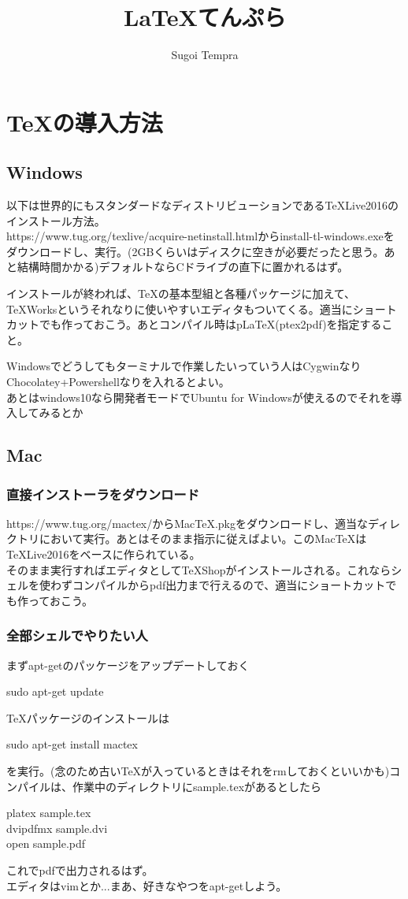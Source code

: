 \documentclass[11pt]{report}
\title{LaTeXてんぷら}
\author{Sugoi Tempra}
\begin{document}
\maketitle%
\tableofcontents%

\chapter{TeXの導入方法}
\section{Windows}
以下は世界的にもスタンダードなディストリビューションであるTeXLive2016のインストール方法。\\
https://www.tug.org/texlive/acquire-netinstall.htmlからinstall-tl-windows.exeをダウンロードし、実行。(2GBくらいはディスクに空きが必要だったと思う。あと結構時間かかる)デフォルトならCドライブの直下に置かれるはず。

インストールが終われば、TeXの基本型組と各種パッケージに加えて、TeXWorksというそれなりに使いやすいエディタもついてくる。適当にショートカットでも作っておこう。あとコンパイル時はpLaTeX(ptex2pdf)を指定すること。

Windowsでどうしてもターミナルで作業したいっていう人はCygwinなりChocolatey+Powershellなりを入れるとよい。\\
あとはwindows10なら開発者モードでUbuntu for Windowsが使えるのでそれを導入してみるとか

\section{Mac}
\subsection{直接インストーラをダウンロード}
https://www.tug.org/mactex/からMacTeX.pkgをダウンロードし、適当なディレクトリにおいて実行。あとはそのまま指示に従えばよい。このMacTeXはTeXLive2016をベースに作られている。\\
そのまま実行すればエディタとしてTeXShopがインストールされる。これならシェルを使わずコンパイルからpdf出力まで行えるので、適当にショートカットでも作っておこう。
\subsection{全部シェルでやりたい人}
まずapt-getのパッケージをアップデートしておく
\begin{center}
sudo apt-get update
\end{center}
TeXパッケージのインストールは
\begin{center}
sudo apt-get install mactex
\end{center}
を実行。(念のため古いTeXが入っているときはそれをrmしておくといいかも)コンパイルは、作業中のディレクトリにsample.texがあるとしたら
\begin{center}
platex sample.tex\\
dvipdfmx sample.dvi\\
open sample.pdf
\end{center}
これでpdfで出力されるはず。\\
エディタはvimとか...まあ、好きなやつをapt-getしよう。
\end{document}
